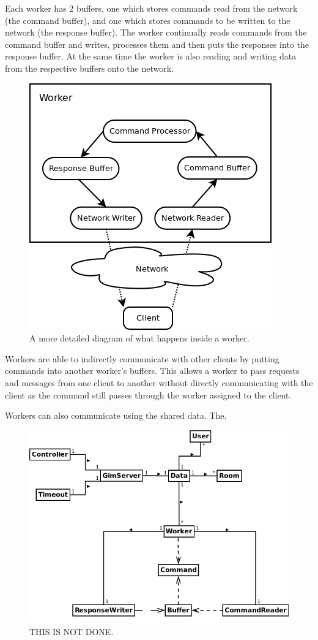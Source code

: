 Each worker has 2 buffers, one which stores commands read from the network (the command buffer), and one which stores commands to be written to the network (the response buffer). The worker continually reads commands from the command buffer and writes, processes them and then puts the responses into the response buffer. At the same time the worker is also reading and writing data from the respective buffers onto the network.

\begin{figure}[!h]
    \begin{center}
        \includegraphics[scale=0.75]{chapter2/diagrams/worker_detail.png}
        \caption{A more detailed diagram of what happens inside a worker.}
        \label{WorkersDia}
    \end{center}
\end{figure}

Workers are able to indirectly communicate with other clients by putting commands into another worker's buffers. This allows a worker to pass requests and messages from one client to another without directly communicating with the client as the command still passes through the worker assigned to the client.

Workers can also communicate using the shared data. The.


\begin{figure}[!h]
    \begin{center}
        \includegraphics[scale=0.65]{chapter2/diagrams/server_uml.png}
        \caption{THIS IS NOT DONE.}
        \label{highLevelDia}
    \end{center}
\end{figure}

